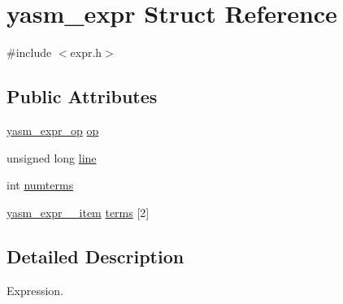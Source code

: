 \hypertarget{structyasm__expr}{\section{yasm\-\_\-expr Struct Reference}
\label{structyasm__expr}
}


{\ttfamily \#include $<$expr.\-h$>$}

\subsection*{Public Attributes}
\begin{DoxyCompactItemize}
\item 
\hyperlink{coretype_8h_af8de22ca487f38e2b239f7ceb9aabb0d}{yasm\-\_\-expr\-\_\-op} \hyperlink{structyasm__expr_a4a552c2cc6aedeab0811401e00de6536}{op}
\item 
unsigned long \hyperlink{structyasm__expr_a6eb7b868214984a4eb2c1fd4e86bf63b}{line}
\item 
int \hyperlink{structyasm__expr_ac21ba309d6e842be19ce00c513645d93}{numterms}
\item 
\hyperlink{structyasm__expr____item}{yasm\-\_\-expr\-\_\-\-\_\-item} \hyperlink{structyasm__expr_a7dcb23a5325b4fa2b66c9e52a07b0d33}{terms} \mbox{[}2\mbox{]}
\end{DoxyCompactItemize}


\subsection{Detailed Description}
Expression. 

